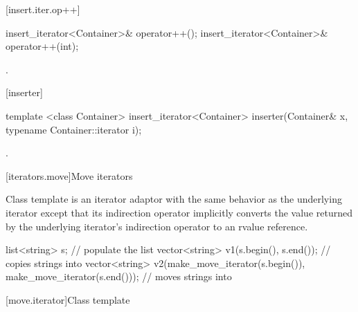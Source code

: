 [insert.iter.op++]{}

%
\begin{itemdecl}
insert_iterator<Container>& operator++();
insert_iterator<Container>& operator++(int);
\end{itemdecl}

\begin{itemdescr}
\pnum
\returns
{}.
\end{itemdescr}

[inserter]{}

%
\begin{itemdecl}
template <class Container>
  insert_iterator<Container> inserter(Container& x, typename Container::iterator i);
\end{itemdecl}

\begin{itemdescr}
\pnum
\returns
{}.
\end{itemdescr}

[iterators.move]{Move iterators}

\pnum
Class template  is an iterator adaptor
with the same behavior as the underlying iterator except that its
indirection operator implicitly converts the value returned by the
underlying iterator's indirection operator to an rvalue reference.
 

\pnum
\enterexample

\begin{codeblock}
list<string> s;
// populate the list 
vector<string> v1(s.begin(), s.end());          // copies strings into 
vector<string> v2(make_move_iterator(s.begin()),
                  make_move_iterator(s.end())); // moves strings into 
\end{codeblock}

\exitexample

[move.iterator]{Class template }

